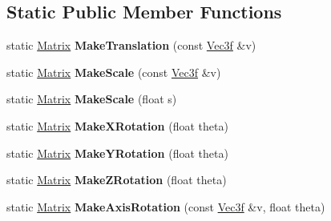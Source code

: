 \subsection*{\-Static \-Public \-Member \-Functions}
\begin{DoxyCompactItemize}
\item 
\hypertarget{classMatrix_a2b1cb490a87242c87a70663740da4ec5}{static \hyperlink{classMatrix}{\-Matrix} {\bfseries \-Make\-Translation} (const \hyperlink{classVec3f}{\-Vec3f} \&v)}\label{classMatrix_a2b1cb490a87242c87a70663740da4ec5}

\item 
\hypertarget{classMatrix_abf53a10add62314631229fc752cd8c84}{static \hyperlink{classMatrix}{\-Matrix} {\bfseries \-Make\-Scale} (const \hyperlink{classVec3f}{\-Vec3f} \&v)}\label{classMatrix_abf53a10add62314631229fc752cd8c84}

\item 
\hypertarget{classMatrix_a503eab51a48058e56e60b6199bb1b8e8}{static \hyperlink{classMatrix}{\-Matrix} {\bfseries \-Make\-Scale} (float s)}\label{classMatrix_a503eab51a48058e56e60b6199bb1b8e8}

\item 
\hypertarget{classMatrix_a2e1addd0f882e4ce73264258525f70e0}{static \hyperlink{classMatrix}{\-Matrix} {\bfseries \-Make\-X\-Rotation} (float theta)}\label{classMatrix_a2e1addd0f882e4ce73264258525f70e0}

\item 
\hypertarget{classMatrix_a0848f661169a85ca7ee24f1d7b30aa80}{static \hyperlink{classMatrix}{\-Matrix} {\bfseries \-Make\-Y\-Rotation} (float theta)}\label{classMatrix_a0848f661169a85ca7ee24f1d7b30aa80}

\item 
\hypertarget{classMatrix_a10fcfa34357b477fd80c25b31e2d9105}{static \hyperlink{classMatrix}{\-Matrix} {\bfseries \-Make\-Z\-Rotation} (float theta)}\label{classMatrix_a10fcfa34357b477fd80c25b31e2d9105}

\item 
\hypertarget{classMatrix_a2134c6c917c3bf24797c1202f56d9e82}{static \hyperlink{classMatrix}{\-Matrix} {\bfseries \-Make\-Axis\-Rotation} (const \hyperlink{classVec3f}{\-Vec3f} \&v, float theta)}\label{classMatrix_a2134c6c917c3bf24797c1202f56d9e82}

\end{DoxyCompactItemize}
